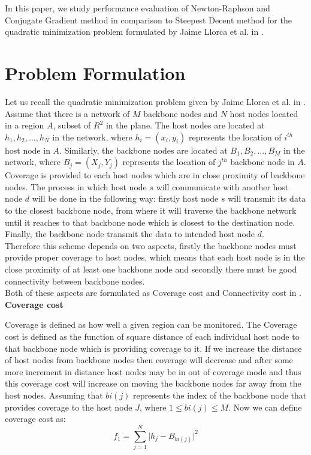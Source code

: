 \documentclass[11pt]{article}
\numberwithin{equation}{section}
\begin{document}
In this paper, we study performance evaluation of Newton-Raphson and Conjugate Gradient method in comparison to Steepest Decent method for the quadratic minimization problem formulated by Jaime Llorca et al. in \cite{lk}.


\section{Problem Formulation}
Let us recall the quadratic minimization problem  given by Jaime Llorca et al. in \cite{lk}. Assume that there is a network of $M$ backbone nodes and $N$ host nodes located in a region $A$, subset of $R^2$ in the plane. The host nodes are located at $h_1, h_2,...,  h_N$ in the network, where $h_i = (x_{i}, y_{i})$ represents the location of $i^{th}$ host node in $ A$. Similarly, the backbone nodes are located at $B_1, B_2,..., B_M$ in the network, where $ B_j = (X_j, Y_j)$ represents the location of $j^{th}$ backbone node in $A$. Coverage is provided to each host nodes which are in close proximity of backbone nodes. The process in which host node $s$ will communicate with another host node $d$ will be done in the following way: firstly host node $s$ will transmit its data to the closest backbone node, from where it will traverse the backbone network until it reaches to that backbone node which is closest to the destination node. Finally, the backbone node transmit the data to intended host node $d$.\\


Therefore this scheme depends on two aspects, firstly the backbone nodes must provide proper coverage to host nodes, which means that each host node is in the close proximity of at least one backbone node and secondly there must be good connectivity between backbone nodes.\\

Both of these aspects are formulated as Coverage cost and Connectivity cost in \cite{lk}.\\

\noindent \textbf{Coverage cost}

Coverage is defined as how well a given region can be monitored. The Coverage cost is defined as the function of square distance of each individual host node to that backbone node which is providing coverage to it. If we increase the distance of host nodes from backbone nodes then coverage will decrease and after some more increment in distance host nodes may be in out of coverage mode and thus this coverage cost will increase on moving the backbone nodes far away from the host nodes. Assuming that $bi(j)$ represents the index of the backbone node that provides coverage to the host node $J$, where  $1\leq bi(j) \leq M$. Now we can define coverage cost as:
\begin{equation}\label{e21}
f_{1}=\sum\limits_{j=1}^{N}{\vert h_{j}-B_{bi(j)}\vert}^{2}
\end{equation}
\end{document}
